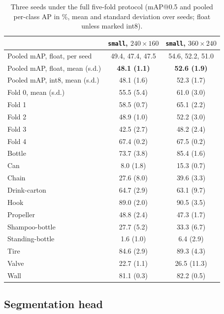 \documentclass[11pt,a4paper]{article}
\newcommand{\cfg}[1]{\texttt{#1}}
\begin{document}
\begin{table}[h]
  \centering
  \small
  \begin{tabular}{lcc}
    \toprule
    & \cfg{small}, $240{\times}160$ & \cfg{small}, $360{\times}240$ \\
    \midrule
    Pooled mAP, float, per seed & 49.4, 47.4, 47.5 & 54.6, 52.2, 51.0 \\
    Pooled mAP, float, mean (s.d.) & \textbf{48.1 (1.1)} & \textbf{52.6 (1.9)} \\
    Pooled mAP, int8, mean (s.d.) & 48.1 (1.6) & 52.3 (1.7) \\
    \midrule
    Fold 0, mean (s.d.) & 55.5 (5.4) & 61.0 (3.0) \\
    Fold 1 & 58.5 (0.7) & 65.1 (2.2) \\
    Fold 2 & 48.9 (1.0) & 52.2 (3.0) \\
    Fold 3 & 42.5 (2.7) & 48.2 (2.4) \\
    Fold 4 & 67.4 (0.2) & 67.5 (0.2) \\
    \midrule
    Bottle & 73.7 (3.8) & 85.4 (1.6) \\
    Can & 8.0 (1.8) & 15.3 (0.7) \\
    Chain & 27.6 (8.0) & 39.6 (3.3) \\
    Drink-carton & 64.7 (2.9) & 63.1 (9.7) \\
    Hook & 89.0 (2.0) & 90.5 (3.5) \\
    Propeller & 48.8 (2.4) & 47.3 (1.7) \\
    Shampoo-bottle & 27.7 (5.2) & 33.3 (6.7) \\
    Standing-bottle & 1.6 (1.0) & 6.4 (2.9) \\
    Tire & 84.6 (2.9) & 89.3 (4.3) \\
    Valve & 22.7 (1.1) & 26.5 (11.3) \\
    Wall & 81.1 (0.3) & 82.2 (0.5) \\
    \bottomrule
  \end{tabular}
  \caption{Three seeds under the full five-fold protocol (mAP@0.5 and
  pooled per-class AP in \%, mean and standard deviation over seeds; float
  unless marked int8).}
  \label{tab:seeds}
\end{table}

\subsection{Segmentation head}
\label{sec:segres}
\end{document}
